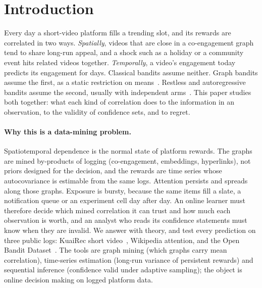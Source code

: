 \documentclass[sigconf,review,anonymous]{acmart}
\begin{document}
\maketitle

\section{Introduction}

Every day a short-video platform fills a trending slot, and its rewards are correlated in two ways. \emph{Spatially}, videos that are close in a co-engagement graph tend to share long-run appeal, and a shock such as a holiday or a community event hits related videos together. \emph{Temporally}, a video's engagement today predicts its engagement for days. Classical bandits assume neither. Graph bandits assume the first, as a static restriction on means~\cite{valko2014spectral,ban2021local}. Restless and autoregressive bandits assume the second, usually with independent arms~\cite{chen2023autoregressive,trella2025latent}. This paper studies both together: what each kind of correlation does to the information in an observation, to the validity of confidence sets, and to regret.

\paragraph{Why this is a data-mining problem.} Spatiotemporal dependence is the normal state of platform rewards. The graphs are mined by-products of logging (co-engagement, embeddings, hyperlinks), not priors designed for the decision, and the rewards are time series whose autocovariance is estimable from the same logs. Attention persists and spreads along those graphs. Exposure is bursty, because the same items fill a slate, a notification queue or an experiment cell day after day. An online learner must therefore decide which mined correlation it can trust and how much each observation is worth, and an analyst who reads its confidence statements must know when they are invalid. We answer with theory, and test every prediction on three public logs: KuaiRec short video~\cite{gao2022kuairec}, Wikipedia attention, and the Open Bandit Dataset~\cite{saito2021obd}. The tools are graph mining (which graphs carry mean correlation), time-series estimation (long-run variance of persistent rewards) and sequential inference (confidence valid under adaptive sampling); the object is online decision making on logged platform data.
\end{document}

